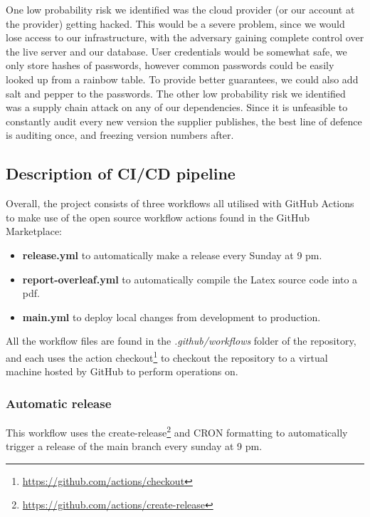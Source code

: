 \documentclass[report/main.tex]{subfiles}
\begin{document}
        One low probability risk we identified was the cloud provider (or our account at the provider) getting hacked. This would be a severe problem, since we would lose access to our infrastructure, with the adversary gaining complete control over the live server and our database. User credentials would be somewhat safe, we only store hashes of passwords, however common passwords could be easily looked up from a rainbow table. To provide better guarantees, we could also add salt and pepper to the passwords.
        The other low probability risk we identified was a supply chain attack on any of our dependencies. Since it is unfeasible to constantly audit every new version the supplier publishes, the best line of defence is auditing once, and freezing version numbers after.
        
        \subsection{Description of CI/CD pipeline}
        Overall, the project consists of three workflows all utilised with GitHub Actions to make use of the open source workflow actions found in the GitHub Marketplace:
        \begin{itemize} 
            \item \textbf{release.yml} to automatically make a release every Sunday at 9 pm. 
            \item \textbf{report-overleaf.yml} to automatically compile the Latex source code into a pdf.
            \item \textbf{main.yml} to deploy local changes from development to production.
        \end{itemize}
        
        All the workflow files are found in the \textit{.github/workflows} folder of the repository, and each uses the action checkout\footnote{\hyperlink{checkout action}{https://github.com/actions/checkout}} to checkout the repository to a virtual machine hosted by GitHub to perform operations on. 
        
        \subsubsection{Automatic release}
        
        This workflow uses the create-release\footnote{\hyperlink{release action}{https://github.com/actions/create-release}} and CRON formatting to automatically trigger a release of the main branch every sunday at 9 pm. 
        
\end{document}
